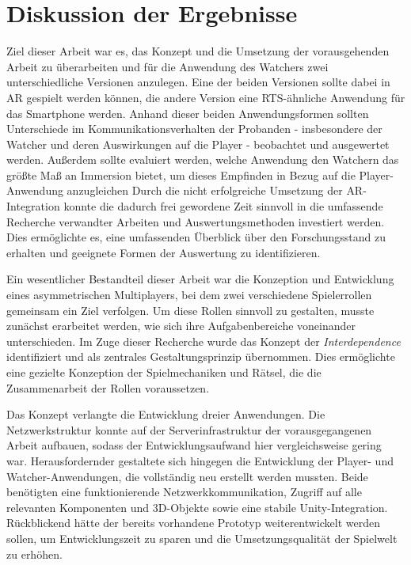 \chapter{Diskussion der Ergebnisse}\label{sec:discussion}
Ziel dieser Arbeit war es, das Konzept und die Umsetzung der vorausgehenden Arbeit zu überarbeiten und für die Anwendung des Watchers zwei unterschiedliche Versionen anzulegen. Eine der beiden Versionen sollte dabei in \ac{AR} gespielt werden können, die andere Version eine \ac{RTS}-ähnliche Anwendung für das Smartphone werden. Anhand dieser beiden Anwendungsformen sollten Unterschiede im Kommunikationsverhalten der Probanden - insbesondere der Watcher und deren Auswirkungen auf die Player - beobachtet und ausgewertet werden. Außerdem sollte evaluiert werden, welche Anwendung den Watchern das größte Maß an Immersion bietet, um dieses Empfinden in Bezug auf die Player-Anwendung anzugleichen
Durch die nicht erfolgreiche Umsetzung der \ac{AR}-Integration konnte die dadurch frei gewordene Zeit sinnvoll in die umfassende Recherche verwandter Arbeiten und Auswertungsmethoden investiert werden. Dies ermöglichte es, eine umfassenden Überblick über den Forschungsstand zu erhalten und geeignete Formen der Auswertung zu identifizieren.

Ein wesentlicher Bestandteil dieser Arbeit war die Konzeption und Entwicklung eines asymmetrischen Multiplayers, bei dem zwei verschiedene Spielerrollen gemeinsam ein Ziel verfolgen. Um diese Rollen sinnvoll zu gestalten, musste zunächst erarbeitet werden, wie sich ihre Aufgabenbereiche voneinander unterschieden. Im Zuge dieser Recherche wurde das Konzept der \textit{Interdependence} identifiziert und als zentrales Gestaltungsprinzip übernommen. Dies ermöglichte eine gezielte Konzeption der Spielmechaniken und Rätsel, die die Zusammenarbeit der Rollen voraussetzen.

Das Konzept verlangte die Entwicklung dreier Anwendungen. Die Netzwerkstruktur konnte auf der Serverinfrastruktur der vorausgegangenen Arbeit aufbauen, sodass der Entwicklungsaufwand hier vergleichsweise gering war. Herausfordernder gestaltete sich hingegen die Entwicklung der Player- und Watcher-Anwendungen, die vollständig neu erstellt werden mussten. Beide benötigten eine funktionierende Netzwerkkommunikation, Zugriff auf alle relevanten Komponenten und \ac{3D}-Objekte sowie eine stabile Unity-Integration. Rückblickend hätte der bereits vorhandene Prototyp weiterentwickelt werden sollen, um Entwicklungszeit zu sparen und die Umsetzungsqualität der Spielwelt zu erhöhen.

